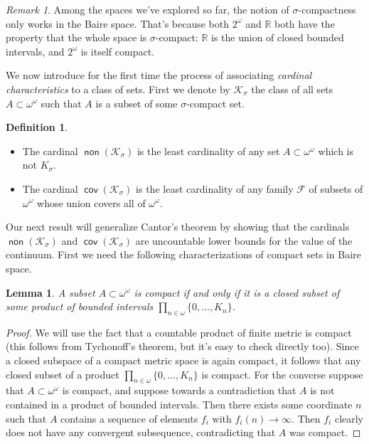 \documentclass[11pt,oneside]{amsbook}
\newcommand{\RR}{\mathbb R}
\newcommand{\Ksigma}{\mathcal K_\sigma}
\DeclareMathOperator{\non}{\mathsf{non}}
\DeclareMathOperator{\cov}{\mathsf{cov}}
\theoremstyle{definition}
\theoremstyle{plain}
\newtheorem{lem}[thm]{Lemma}
\theoremstyle{definition}
\newtheorem{defn}[thm]{Definition}
\theoremstyle{remark}
\newtheorem{rem}[thm]{Remark}
\begin{document}
\begin{rem}
  Among the spaces we've explored so far, the notion of $\sigma$-compactness only works in the Baire space. That's because both $2^\omega$ and $\RR$ both have the property that the whole space is $\sigma$-compact: $\RR$ is the union of closed bounded intervals, and $2^\omega$ is itself compact.
\end{rem}

We now introduce for the first time the process of associating \emph{cardinal characteristics} to a class of sets. First we denote by $\Ksigma$ the class of all sets $A\subset\omega^\omega$ such that $A$ is a subset of some $\sigma$-compact set.

\begin{defn}
  \begin{itemize}
  \item The cardinal $\non(\Ksigma)$ is the least cardinality of any set $A\subset\omega^\omega$ which is not $K_\sigma$.
  \item The cardinal $\cov(\Ksigma)$ is the least cardinality of any family $\mathcal F$ of subsets of $\omega^\omega$ whose union covers all of $\omega^\omega$.
  \end{itemize}
\end{defn}

Our next result will generalize Cantor's theorem by showing that the cardinals $\non(\Ksigma)$ and $\cov(\Ksigma)$ are uncountable lower bounds for the value of the continuum. First we need the following characterizations of compact sets in Baire space.

\begin{lem}
  \label{lem:baire-compact}
  A subset $A\subset\omega^\omega$ is compact if and only if it is a closed subset of some product of bounded intervals $\prod_{n\in\omega}\{0,\ldots,K_n\}$.
\end{lem}

\begin{proof}
  We will use the fact that a countable product of finite metric is compact (this follows from Tychonoff's theorem, but it's easy to check directly too). Since a closed subspace of a compact metric space is again compact, it follows that any closed subset of a product $\prod_{n\in\omega}\{0,\ldots,K_n\}$ is compact. For the converse suppose that $A\subset\omega^\omega$ is compact, and suppose towards a contradiction that $A$ is not contained in a product of bounded intervals. Then there exists some coordinate $n$ such that $A$ contains a sequence of elements $f_i$ with $f_i(n)\to\infty$. Then $f_i$ clearly does not have any convergent subsequence, contradicting that $A$ was compact.
\end{proof}
\end{document}
